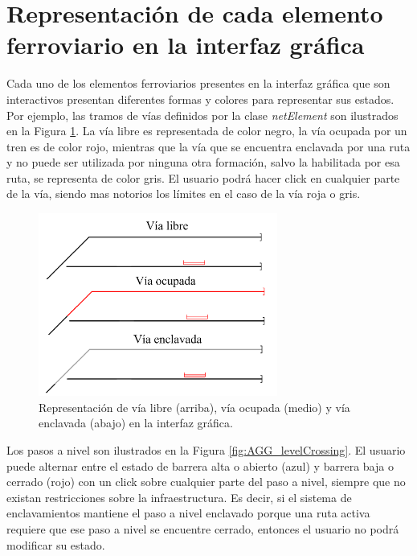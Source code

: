 	\section{Representación de cada elemento ferroviario en la interfaz gráfica}
	\label{sec:AGG_STATUS}
	
	Cada uno de los elementos ferroviarios presentes en la interfaz gráfica que son interactivos presentan diferentes formas y colores para representar sus estados. Por ejemplo, las tramos de vías definidos por la clase \textit{netElement} son ilustrados en la Figura \ref{fig:AGG_tracks}. La vía libre es representada de color negro, la vía ocupada por un tren es de color rojo, mientras que la vía que se encuentra enclavada por una ruta y no puede ser utilizada por ninguna otra formación, salvo la habilitada por esa ruta, se representa de color gris. El usuario podrá hacer click en cualquier parte de la vía, siendo mas notorios los límites en el caso de la vía roja o gris.
		
	\begin{figure}[H]
		\centering
		\includegraphics[width=0.7\textwidth]{AGG/images/AGG_via}
		\centering\caption{Representación de vía libre (arriba), vía ocupada (medio) y vía enclavada (abajo) en la interfaz gráfica.}
		\label{fig:AGG_tracks}
	\end{figure}
	
	Los pasos a nivel son ilustrados en la Figura \ref{fig:AGG_levelCrossing}. El usuario puede alternar entre el estado de barrera alta o abierto (azul) y barrera baja o cerrado (rojo) con un click sobre cualquier parte del paso a nivel, siempre que no existan restricciones sobre la infraestructura. Es decir, si el sistema de enclavamientos mantiene el paso a nivel enclavado porque una ruta activa requiere que ese paso a nivel se encuentre cerrado, entonces el usuario no podrá modificar su estado.
	
